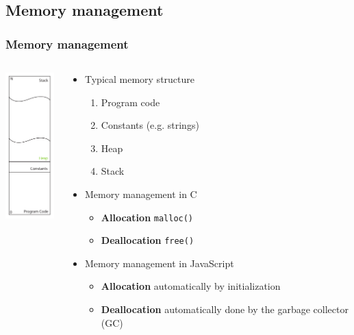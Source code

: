 \documentclass{beamer}
\begin{document}
	\subsection{Memory management}
	\begin{frame}
		\frametitle{Memory management}
		\begin{columns}
			\begin{column}{.1\linewidth}
				\includegraphics[width=5.5em]{./imgs/memory.pdf}
			\end{column}
			\begin{column}{.7\linewidth}
				\begin{itemize}
					\item Typical memory structure
					\begin{enumerate}
						\item Program code
						\item Constants (e.g. strings) 
						\item Heap
						\item Stack
					\end{enumerate}
				
					\pause
		
					\item Memory management in C
					\begin{itemize}
						\item \textbf{Allocation} \texttt{malloc()}
						\item \textbf{Deallocation} \texttt{free()}
					\end{itemize}
		
					\pause
		
					\item Memory management in JavaScript
					\begin{itemize}	
						\item \textbf{Allocation} automatically by initialization 
						\item \textbf{Deallocation} automatically done by the garbage collector (GC)
					\end{itemize}
				\end{itemize}
			\end{column}
		\end{columns}
	\end{frame}
	
\end{document}
